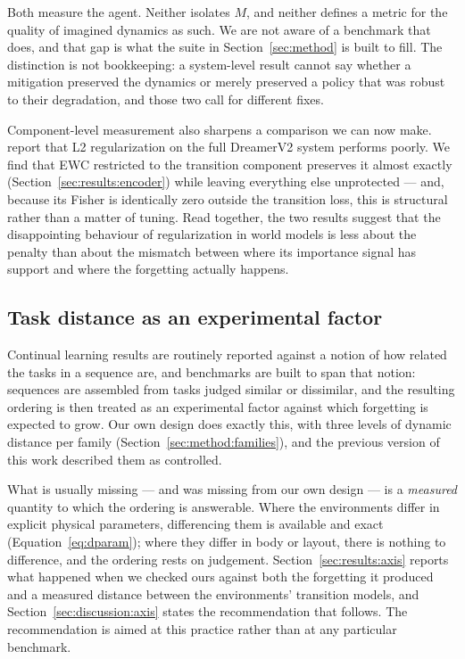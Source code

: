 Both measure the agent. Neither isolates $M$, and neither defines a metric for
the quality of imagined dynamics as such. We are not aware of a benchmark that
does, and that gap is what the suite in Section~\ref{sec:method} is built to
fill. The distinction is not bookkeeping: a system-level result cannot say
whether a mitigation preserved the dynamics or merely preserved a policy that
was robust to their degradation, and those two call for different fixes.

Component-level measurement also sharpens a comparison we can now make.
\citet{kessler2023effectiveness} report that L2 regularization on the full
DreamerV2 system performs poorly. We find that EWC restricted to the transition
component preserves it almost exactly (Section~\ref{sec:results:encoder}) while
leaving everything else unprotected --- and, because its Fisher is identically
zero outside the transition loss, this is structural rather than a matter of
tuning. Read together, the two results suggest that the disappointing behaviour
of regularization in world models is less about the penalty than about the
mismatch between where its importance signal has support and where the
forgetting actually happens.

\subsection{Task distance as an experimental factor}
\label{sec:related:distance}

Continual learning results are routinely reported against a notion of how
related the tasks in a sequence are, and benchmarks are built to span that
notion: sequences are assembled from tasks judged similar or dissimilar, and the
resulting ordering is then treated as an experimental factor against which
forgetting is expected to grow. Our own design does exactly this, with three
levels of dynamic distance per family
(Section~\ref{sec:method:families}), and the previous version of this work
described them as controlled.

What is usually missing --- and was missing from our own design --- is a
\emph{measured} quantity to which the ordering is answerable. Where the
environments differ in explicit physical parameters, differencing them is
available and exact (Equation~\ref{eq:dparam}); where they differ in body or
layout, there is nothing to difference, and the ordering rests on judgement.
Section~\ref{sec:results:axis} reports what happened when we checked ours
against both the forgetting it produced and a measured distance between the
environments' transition models, and Section~\ref{sec:discussion:axis} states
the recommendation that follows. The recommendation is aimed at this practice
rather than at any particular benchmark.


